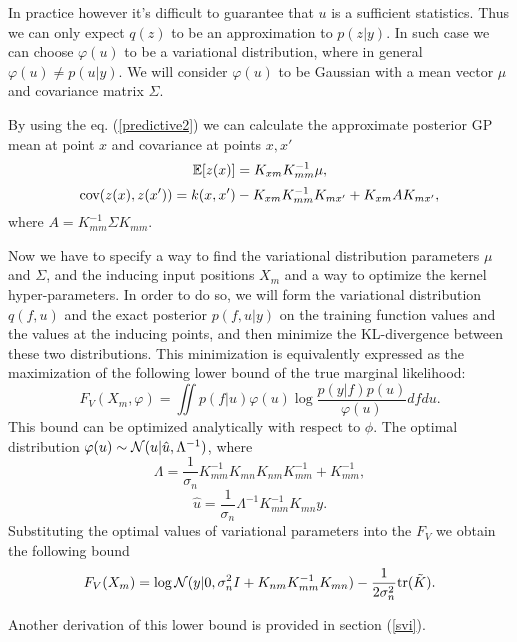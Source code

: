 \documentclass[12pt]{article}
\begin{document}
		In practice however it's difficult to guarantee that $u$ is a sufficient statistics. Thus we can only expect $q(z)$ to be an approximation to $p(z|y)$. In such case we can choose $\varphi(u)$ to be a variational distribution, where in general $\varphi(u) \ne p(u | y)$. We will consider $\varphi(u)$ to be Gaussian with a mean vector $\mu$ and covariance matrix $\Sigma$.

		By using the eq. (\ref{predictive2}) we can calculate the approximate posterior GP mean at point $x$ and covariance at points $x, x'$
		$$\mathbb{E}[z(x)] = K_{xm} K_{mm}^{-1} \mu,$$ 
		$$\mbox{cov}(z(x), z(x')) = k(x, x') - K_{xm} K_{mm}^{-1} K_{mx'} + K_{xm} A K_{mx'},$$
		where $A = K_{mm}^{-1} \Sigma K_{mm}$.

		Now we have to specify a way to find the variational distribution parameters $\mu$ and $\Sigma$, and the inducing input positions $X_m$ and a way to optimize the kernel hyper-parameters. 
		In order to do so, we will form the variational distribution $q(f, u)$ and the exact posterior $p(f, u|y)$ on the training function values and the values at the inducing points, and then minimize the KL-divergence between these two distributions. This minimization is equivalently expressed as the maximization of the following lower bound of the true marginal likelihood:
		$$F_V(X_m, \varphi) = \iint p(f|u) \varphi(u) \log \frac{p(y|f) p(u)}{\varphi(u)} df du.$$
		This bound can be optimized analytically with respect to $\phi$. The optimal distribution $\varphi(u) \sim \mathcal{N}(u|\hat u, \Lambda^{-1})$, where
		$$\Lambda = \frac 1 {\sigma_n} K_{mm}^{-1} K_{mn} K_{nm} K_{mm}^{-1} + K_{mm}^{-1},$$
		$$\hat u = \frac 1 {\sigma_n} \Lambda^{-1} K_{mm}^{-1} K_{mn} y.$$
		Substituting the optimal values of variational parameters into the $F_V$ we obtain the following bound
		$$F_V(X_m) = \log \mathcal{N}(y|0, \sigma_n^2 I + K_{nm} K_{mm}^{-1} K_{mn}) - \frac 1 {2\sigma_n^2} \mbox{tr}(\tilde K).$$

		Another derivation of this lower bound is provided in section (\ref{svi}).
\end{document}
